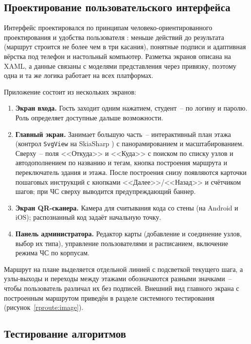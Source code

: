 \subsection{Проектирование пользовательского интерфейса}

Интерфейс проектировался по принципам человеко-ориентированного проектирования и удобства пользователя \cite{urbanovich2023,sterlyagov2017}: меньше действий до результата (маршрут строится не более чем в три касания), понятные подписи и адаптивная вёрстка под телефон и настольный компьютер. Разметка экранов описана на XAML, а данные связаны с моделями представления через привязку, поэтому одна и та же логика работает на всех платформах.

Приложение состоит из нескольких экранов:
\begin{enumerate}
	\item \textbf{Экран входа.} Гость заходит одним нажатием, студент~-- по логину и паролю. Роль определяет доступные дальше возможности.
	\item \textbf{Главный экран.} Занимает большую часть~-- интерактивный план этажа (контрол \texttt{SvgView} на SkiaSharp \cite{skiasharp}) с панорамированием и масштабированием. Сверху~-- поля <<Откуда>> и <<Куда>> с поиском по списку узлов и автодополнением по названию и тегам, кнопка построения маршрута и переключатель здания и этажа. После построения снизу появляются карточки пошаговых инструкций с кнопками <<Далее>>/<<Назад>> и счётчиком шагов; при ЧС сверху выводится предупреждающий баннер.
	\item \textbf{Экран QR-сканера.} Камера для считывания кода со стены (на Android и iOS); распознанный код задаёт начальную точку.
	\item \textbf{Панель администратора.} Редактор карты (добавление и соединение узлов, выбор их типа), управление пользователями и расписанием, включение режима ЧС по корпусам.
\end{enumerate}

Маршрут на плане выделяется отдельной линией с подсветкой текущего шага, а узлы-выходы и переходы между этажами обозначаются разными значками~-- чтобы пользователь различал их без подписей. Внешний вид главного экрана с построенным маршрутом приведён в разделе системного тестирования (рисунок~\ref{rproute:image}).

\subsection{Тестирование алгоритмов}

